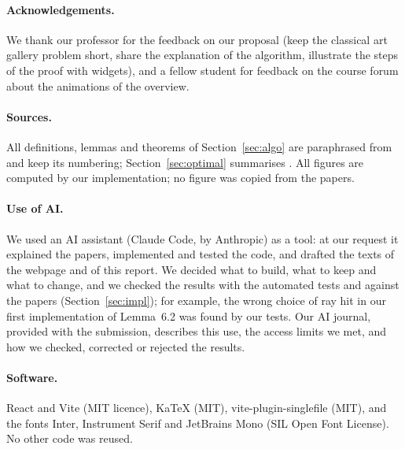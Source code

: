\documentclass[11pt,a4paper]{article}
\theoremstyle{definition}
\theoremstyle{remark}
\begin{document}
\paragraph{Acknowledgements.} We thank our professor for the feedback on our proposal (keep the classical art gallery problem short, share the explanation
of the algorithm, illustrate the steps of the proof with widgets), and a fellow student for feedback on the course forum about the animations of the overview.

\paragraph{Sources.} All definitions, lemmas and theorems of Section~\ref{sec:algo} are paraphrased from~\cite{deBerg2025} and keep its numbering; Section~\ref{sec:optimal} summarises
\cite{deBerg2026}. All figures are computed by our implementation; no figure was copied from the papers.

\paragraph{Use of AI.} We used an AI assistant (Claude Code, by Anthropic) as a tool: at our request it explained the papers, implemented and tested the code,
and drafted the texts of the webpage and of this report. We decided what to build, what to keep and what to change, and we checked the results with the automated tests
and against the papers (Section~\ref{sec:impl}); for example, the wrong choice of ray hit in our first implementation of Lemma~6.2 was found by our tests.
Our AI journal, provided with the submission, describes this use, the access limits we met, and how we checked, corrected or rejected the results.

\paragraph{Software.} React and Vite (MIT licence), KaTeX (MIT), vite-plugin-singlefile (MIT), and the fonts Inter, Instrument Serif and JetBrains Mono
(SIL Open Font License). No other code was reused.
\end{document}
